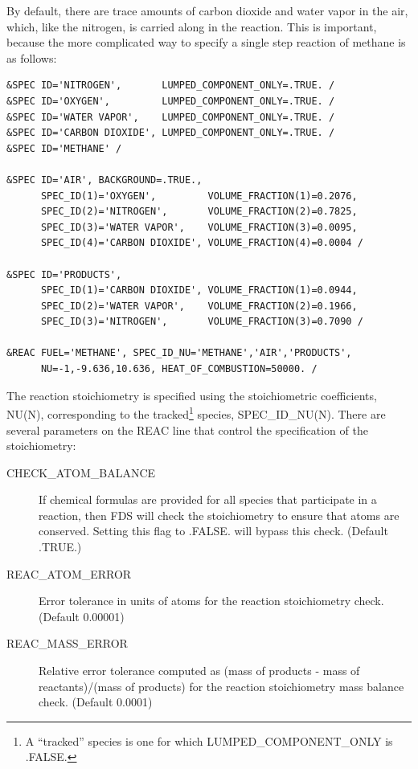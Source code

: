 \documentclass[11pt]{book}
\begin{document}
\noindent By default, there are trace amounts of carbon dioxide and water vapor in the air, which, like the nitrogen, is carried along in the reaction. This is important, because the more complicated way to specify a single step reaction of methane is as follows:

\begin{lstlisting}
&SPEC ID='NITROGEN',       LUMPED_COMPONENT_ONLY=.TRUE. /
&SPEC ID='OXYGEN',         LUMPED_COMPONENT_ONLY=.TRUE. /
&SPEC ID='WATER VAPOR',    LUMPED_COMPONENT_ONLY=.TRUE. /
&SPEC ID='CARBON DIOXIDE', LUMPED_COMPONENT_ONLY=.TRUE. /
&SPEC ID='METHANE' /

&SPEC ID='AIR', BACKGROUND=.TRUE.,
      SPEC_ID(1)='OXYGEN',         VOLUME_FRACTION(1)=0.2076,
      SPEC_ID(2)='NITROGEN',       VOLUME_FRACTION(2)=0.7825,
      SPEC_ID(3)='WATER VAPOR',    VOLUME_FRACTION(3)=0.0095,
      SPEC_ID(4)='CARBON DIOXIDE', VOLUME_FRACTION(4)=0.0004 /

&SPEC ID='PRODUCTS',
      SPEC_ID(1)='CARBON DIOXIDE', VOLUME_FRACTION(1)=0.0944,
      SPEC_ID(2)='WATER VAPOR',    VOLUME_FRACTION(2)=0.1966,
      SPEC_ID(3)='NITROGEN',       VOLUME_FRACTION(3)=0.7090 /

&REAC FUEL='METHANE', SPEC_ID_NU='METHANE','AIR','PRODUCTS',
      NU=-1,-9.636,10.636, HEAT_OF_COMBUSTION=50000. /
\end{lstlisting}

\noindent
The reaction stoichiometry is specified using the stoichiometric coefficients, {\ct NU(N)}, corresponding to the tracked\footnote{A ``tracked'' species is one for which {\ct LUMPED\_COMPONENT\_ONLY} is {\ct .FALSE.}} species, {\ct SPEC\_ID\_NU(N)}. There are several parameters on the {\ct REAC} line that control the specification of the stoichiometry:
\begin{description}
\item[{\ct CHECK\_ATOM\_BALANCE}] If chemical formulas are provided for all species that participate in a reaction, then FDS will check the stoichiometry to ensure that atoms are conserved.  Setting this flag to {\ct .FALSE.} will bypass this check.  (Default {\ct .TRUE.})
\item[{\ct REAC\_ATOM\_ERROR}] Error tolerance in units of atoms for the reaction stoichiometry check.  (Default 0.00001)
\item[{\ct REAC\_MASS\_ERROR}] Relative error tolerance computed as (mass of products - mass of reactants)/(mass of products) for the reaction stoichiometry mass balance check.  (Default 0.0001)
\end{description}
\end{document}
